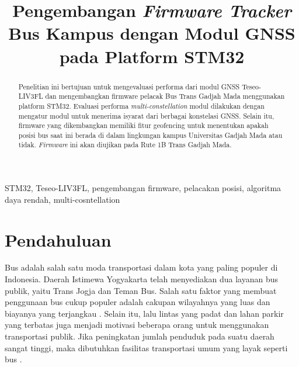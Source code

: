 \documentclass[conference]{IEEEtran}
\begin{document}
\title{Pengembangan \textit{Firmware Tracker} Bus Kampus dengan Modul GNSS pada Platform STM32}

\author{
}

\maketitle

\begin{abstract}
Penelitian ini bertujuan untuk mengevaluasi performa dari modul GNSS Teseo-LIV3FL dan mengembangkan firmware pelacak Bus Trans Gadjah Mada menggunakan platform STM32. Evaluasi performa \textit{multi-constellation} modul dilakukan dengan mengatur modul untuk menerima isyarat dari berbagai konstelasi GNSS. Selain itu, firmware yang dikembangkan memiliki fitur geofencing untuk menentukan apakah posisi bus saat ini berada di dalam lingkungan kampus Universitas Gadjah Mada atau tidak. \textit{Firmware} ini akan diujikan pada Rute 1B Trans Gadjah Mada.
\end{abstract}

\begin{IEEEkeywords}
STM32, Teseo-LIV3FL, pengembangan firmware, pelacakan posisi, algoritma daya rendah, multi-cosntellation
\end{IEEEkeywords}

\section{Pendahuluan}
Bus adalah salah satu moda transportasi dalam kota yang paling populer di Indonesia. Daerah Istimewa Yogyakarta telah menyediakan dua layanan bus publik, yaitu Trans Jogja dan Teman Bus. Salah satu faktor yang membuat penggunaan bus cukup populer adalah cakupan wilayahnya yang luas dan biayanya yang terjangkau \cite{Rohani2013}. Selain itu, lalu lintas yang padat dan lahan parkir yang terbatas juga menjadi motivasi beberapa orang untuk menggunakan transportasi publik. Jika peningkatan jumlah penduduk pada suatu daerah sangat tinggi, maka dibutuhkan fasilitas transportasi umum yang layak seperti bus \cite{Sutandi2015}.
\end{document}

